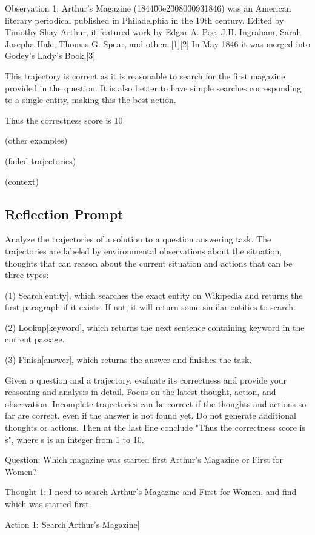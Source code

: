 \documentclass{article} \usepackage{iclr2024_conference,times}
\begin{document}
Observation 1: Arthur's Magazine (1844\u00e2\u0080\u00931846) was an American literary periodical published in Philadelphia in the 19th century. Edited by Timothy Shay Arthur, it featured work by Edgar A. Poe, J.H. Ingraham, Sarah Josepha Hale, Thomas G. Spear, and others.[1][2] In May 1846 it was merged into Godey's Lady's Book.[3]

This trajectory is correct as it is reasonable to search for the first magazine provided in the question. It is also better to have simple searches corresponding to a single entity, making this the best action.

Thus the correctness score is 10

(other examples)

(failed trajectories)

(context)

\subsection{Reflection Prompt}


Analyze the trajectories of a solution to a question answering task. The trajectories are labeled by environmental observations about the situation, thoughts that can reason about the current situation and actions that can be three types: 

(1) Search[entity], which searches the exact entity on Wikipedia and returns the first paragraph if it exists. If not, it will return some similar entities to search.

(2) Lookup[keyword], which returns the next sentence containing keyword in the current passage.

(3) Finish[answer], which returns the answer and finishes the task.

Given a question and a trajectory, evaluate its correctness and provide your reasoning and analysis in detail. Focus on the latest thought, action, and observation. Incomplete trajectories can be correct if the thoughts and actions so far are correct, even if the answer is not found yet. Do not generate additional thoughts or actions. Then at the last line conclude "Thus the correctness score is {s}", where s is an integer from 1 to 10.

Question: Which magazine was started first Arthur's Magazine or First for Women?

Thought 1: I need to search Arthur's Magazine and First for Women, and find which was started first.

Action 1: Search[Arthur's Magazine]
\end{document}
